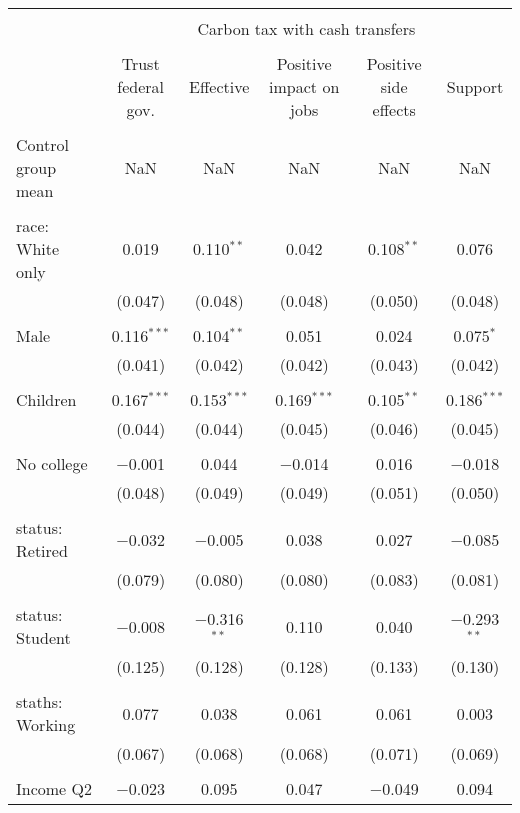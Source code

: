 
\begin{tabular}{@{\extracolsep{5pt}}lccccc} 
\\[-1.8ex]\hline 
\hline \\[-1.8ex] 
 & \multicolumn{5}{c}{Carbon tax with cash transfers} \\ 
\cline{2-6} 
\\[-1.8ex] & Trust federal gov. & Effective & Positive impact on jobs & Positive side effects & Support \\ 
\hline \\[-1.8ex] 
 Control group mean & NaN & NaN & NaN & NaN & NaN  \\ \hline \\[-1.8ex] race: White only & 0.019 & 0.110$^{**}$ & 0.042 & 0.108$^{**}$ & 0.076 \\ 
  & (0.047) & (0.048) & (0.048) & (0.050) & (0.048) \\ 
  & & & & & \\ 
 Male & 0.116$^{***}$ & 0.104$^{**}$ & 0.051 & 0.024 & 0.075$^{*}$ \\ 
  & (0.041) & (0.042) & (0.042) & (0.043) & (0.042) \\ 
  & & & & & \\ 
 Children & 0.167$^{***}$ & 0.153$^{***}$ & 0.169$^{***}$ & 0.105$^{**}$ & 0.186$^{***}$ \\ 
  & (0.044) & (0.044) & (0.045) & (0.046) & (0.045) \\ 
  & & & & & \\ 
 No college & $-$0.001 & 0.044 & $-$0.014 & 0.016 & $-$0.018 \\ 
  & (0.048) & (0.049) & (0.049) & (0.051) & (0.050) \\ 
  & & & & & \\ 
 status: Retired & $-$0.032 & $-$0.005 & 0.038 & 0.027 & $-$0.085 \\ 
  & (0.079) & (0.080) & (0.080) & (0.083) & (0.081) \\ 
  & & & & & \\ 
 status: Student & $-$0.008 & $-$0.316$^{**}$ & 0.110 & 0.040 & $-$0.293$^{**}$ \\ 
  & (0.125) & (0.128) & (0.128) & (0.133) & (0.130) \\ 
  & & & & & \\ 
 staths: Working & 0.077 & 0.038 & 0.061 & 0.061 & 0.003 \\ 
  & (0.067) & (0.068) & (0.068) & (0.071) & (0.069) \\ 
  & & & & & \\ 
 Income Q2 & $-$0.023 & 0.095 & 0.047 & $-$0.049 & 0.094 \\ 

\end{tabular}
